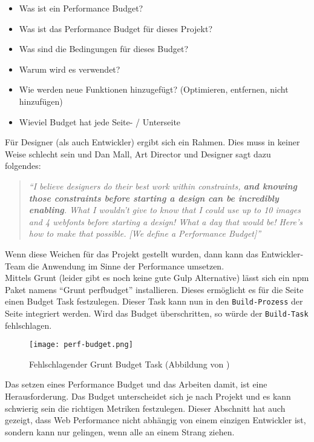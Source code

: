 			\begin{itemize}
				\item Was ist ein Performance Budget?
				\item Was ist das Performance Budget für dieses Projekt?
				\item Was sind die Bedingungen für dieses Budget?
				\item Warum wird es verwendet?
				\item Wie werden neue Funktionen hinzugefügt? (Optimieren, entfernen, nicht hinzufügen)
				\item Wieviel Budget hat jede Seite- / Unterseite
			\end{itemize}

			Für Designer (als auch Entwickler) ergibt sich ein Rahmen. Dies muss in keiner Weise schlecht sein und Dan Mall, Art Director und Designer sagt dazu folgendes:

			\begin{quote}
				\textit{"`I believe designers do their best work within constraints, \textbf{and knowing those constraints before starting a design can be incredibly enabling}. What I wouldn’t give to know that I could use up to 10 images and 4 webfonts before starting a design! What a day that would be! Here’s how to make that possible. [We define a Performance Budget]"'}\autocite{mall14}
			\end{quote}

			Wenn diese Weichen für das Projekt gestellt wurden, dann kann das Entwickler-Team die Anwendung im Sinne der Performance umsetzen.\\
			Mittels Grunt (leider gibt es noch keine gute Gulp Alternative) lässt sich ein npm Paket namens "`Grunt perfbudget"' installieren. Dieses ermöglicht es für die Seite einen Budget Task festzulegen. Dieser Task kann nun in den \texttt{Build-Prozess} der Seite integriert werden. Wird das Budget überschritten, so würde der \texttt{Build-Task} fehlschlagen.

			\begin{figure}[htbp]
				\begin{center}
					\texttt{[image: perf-budget.png]}
					\caption{Fehlschlagender Grunt Budget Task (Abbildung von \autocite{farman14})}
					\label{fig:perf-budget}
				\end{center}
			\end{figure}
		
		Das setzen eines Performance Budget und das Arbeiten damit, ist eine Herausforderung. Das Budget unterscheidet sich je nach Projekt und es kann schwierig sein die richtigen Metriken festzulegen. Dieser Abschnitt hat auch gezeigt, dass Web Performance nicht abhängig von einem einzigen Entwickler ist, sondern kann nur gelingen, wenn alle an einem Strang ziehen.	


\pagebreak
%
%
